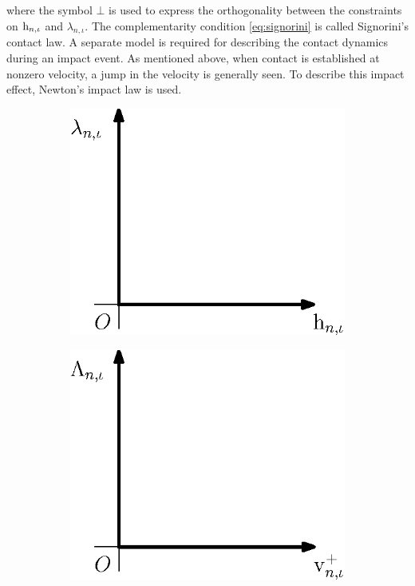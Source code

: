 \documentclass[../DC2017114Bouma.tex]{subfiles}
\begin{document}
where the symbol $\bot$ is used to express the orthogonality between the constraints on $\mathrm{h}_{n,\iota}$ and $\lambda_{n,\iota}$. The complementarity condition \eqref{eq:signorini} is called Signorini's contact law. A separate model is required for describing the contact dynamics during an impact event. As mentioned above, when contact is established at nonzero velocity, a jump in the velocity is generally seen. To describe this impact effect, Newton's impact law is used.
\begin{figure}[bt!]
\centering
\begin{subfigure}{0.3\textwidth}
\centering
\includegraphics[width=\linewidth]{signorinicontact.eps}
\caption{}\label{fig:signorinicontact}
\end{subfigure}
\qquad
\begin{subfigure}{0.3\textwidth}
\centering
\includegraphics[width=\linewidth]{newtonimpact.eps}

\end{subfigure}
\end{figure}
\end{document}
